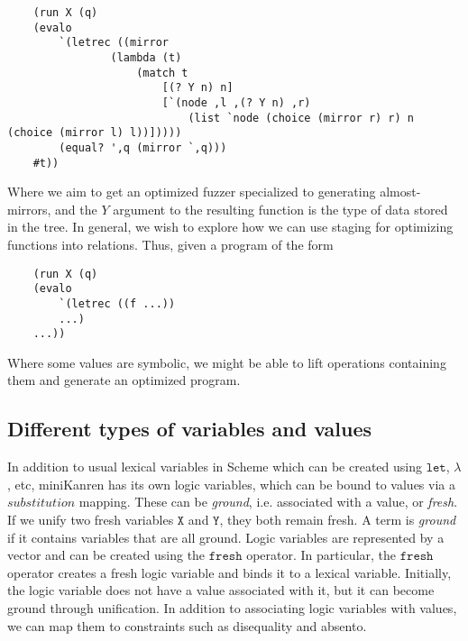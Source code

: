 \documentclass[11pt]{article}
\theoremstyle{definition}
\newcommand{\code}[1]{\texttt{#1}}
\newcommand\tab[1][1cm]{\hspace*{#1}}
\begin{document}
    \begin{lstlisting}
    (run X (q) 
    (evalo 
        `(letrec ((mirror 
                (lambda (t)
                    (match t 
                        [(? Y n) n]
                        [`(node ,l ,(? Y n) ,r)
                            (list `node (choice (mirror r) r) n (choice (mirror l) l))]))))
        (equal? ',q (mirror `,q)))
    #t))
    \end{lstlisting}
Where we aim to get an optimized fuzzer specialized to generating almost-mirrors, and the $Y$ argument to the resulting function is the type of data stored in the tree.\newline 
\tab In general, we wish to explore how we can use staging for optimizing functions into relations. Thus, given a program of the form 
    \begin{lstlisting}
    (run X (q) 
    (evalo 
        `(letrec ((f ...))
        ...)
    ...))
    \end{lstlisting}
    \tab Where some values are symbolic, we might be able
    to lift operations containing them and generate an optimized program.
\subsection{Different types of variables and values}
\tab In addition to usual lexical variables in Scheme which can be created using $\code{let}$, $\lambda$, etc, miniKanren has its own logic variables, which can be bound to values via a $\textit{substitution}$ mapping. These can be 
\textit{ground}, i.e. associated with a value, or \textit{fresh}. If we unify two fresh variables $\code{X}$ and $\code{Y}$, they both remain fresh. A term is \textit{ground} if it contains variables that are all ground. Logic variables are represented by a vector and can be created using the $\code{fresh}$ operator. In particular, the $\code{fresh}$ operator 
creates a fresh logic variable and binds it to a lexical variable. Initially, the logic variable does not have a value associated with it, but it can become ground through unification. In addition to associating logic variables with values, we can map them to constraints such as disequality and absento.
\end{document}
